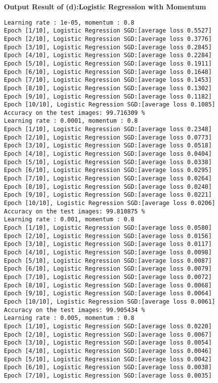 \documentclass[10pt]{article}
\newcommand{\0}{{\mathbf{0}}}
\newcommand{\1}{{\mathbf{1}}}
\begin{document}
\newpage
\textbf{Output Result of (d):Logistic Regression with Momentum}
\begin{verbatim}
Learning rate : 1e-05, momentum : 0.8
Epoch [1/10], Logistic Regression SGD:[average loss 0.5527]
Epoch [2/10], Logistic Regression SGD:[average loss 0.3776]
Epoch [3/10], Logistic Regression SGD:[average loss 0.2845]
Epoch [4/10], Logistic Regression SGD:[average loss 0.2284]
Epoch [5/10], Logistic Regression SGD:[average loss 0.1911]
Epoch [6/10], Logistic Regression SGD:[average loss 0.1648]
Epoch [7/10], Logistic Regression SGD:[average loss 0.1453]
Epoch [8/10], Logistic Regression SGD:[average loss 0.1302]
Epoch [9/10], Logistic Regression SGD:[average loss 0.1182]
Epoch [10/10], Logistic Regression SGD:[average loss 0.1085]
Accuracy on the test images: 99.716309 %
Learning rate : 0.0001, momentum : 0.8
Epoch [1/10], Logistic Regression SGD:[average loss 0.2348]
Epoch [2/10], Logistic Regression SGD:[average loss 0.0773]
Epoch [3/10], Logistic Regression SGD:[average loss 0.0518]
Epoch [4/10], Logistic Regression SGD:[average loss 0.0404]
Epoch [5/10], Logistic Regression SGD:[average loss 0.0338]
Epoch [6/10], Logistic Regression SGD:[average loss 0.0295]
Epoch [7/10], Logistic Regression SGD:[average loss 0.0264]
Epoch [8/10], Logistic Regression SGD:[average loss 0.0240]
Epoch [9/10], Logistic Regression SGD:[average loss 0.0221]
Epoch [10/10], Logistic Regression SGD:[average loss 0.0206]
Accuracy on the test images: 99.810875 %
Learning rate : 0.001, momentum : 0.8
Epoch [1/10], Logistic Regression SGD:[average loss 0.0580]
Epoch [2/10], Logistic Regression SGD:[average loss 0.0156]
Epoch [3/10], Logistic Regression SGD:[average loss 0.0117]
Epoch [4/10], Logistic Regression SGD:[average loss 0.0098]
Epoch [5/10], Logistic Regression SGD:[average loss 0.0087]
Epoch [6/10], Logistic Regression SGD:[average loss 0.0079]
Epoch [7/10], Logistic Regression SGD:[average loss 0.0072]
Epoch [8/10], Logistic Regression SGD:[average loss 0.0068]
Epoch [9/10], Logistic Regression SGD:[average loss 0.0064]
Epoch [10/10], Logistic Regression SGD:[average loss 0.0061]
Accuracy on the test images: 99.905434 %
Learning rate : 0.005, momentum : 0.8
Epoch [1/10], Logistic Regression SGD:[average loss 0.0220]
Epoch [2/10], Logistic Regression SGD:[average loss 0.0067]
Epoch [3/10], Logistic Regression SGD:[average loss 0.0054]
Epoch [4/10], Logistic Regression SGD:[average loss 0.0046]
Epoch [5/10], Logistic Regression SGD:[average loss 0.0042]
Epoch [6/10], Logistic Regression SGD:[average loss 0.0038]
Epoch [7/10], Logistic Regression SGD:[average loss 0.0035]

\end{verbatim}
\end{document}
